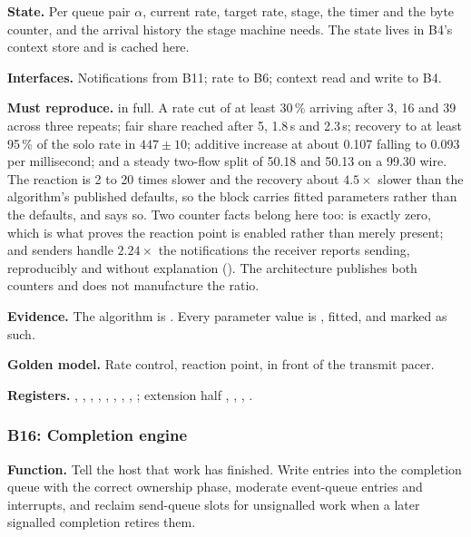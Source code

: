 \textbf{State.} Per queue pair $\alpha$, current rate, target rate, stage, the
timer and the byte counter, and the arrival history the stage machine needs. The
state lives in B4's context store and is cached here.

\textbf{Interfaces.} Notifications from B11; rate to B6; context read and write
to B4.

\textbf{Must reproduce.}  in full. A rate cut of at least 30\,\%
arriving after 3, 16 and 39\mS{} across three repeats; fair share reached after
5\mS{}, 1.8\,s and 2.3\,s; recovery to at least 95\,\% of the solo rate in $447
\pm 10$\mS{}; additive increase at about 0.107 falling to 0.093\Gbps{} per
millisecond; and a steady two-flow split of 50.18 and 50.13\Gbps{} on a
99.30\Gbps{} wire. The reaction is 2 to 20 times slower and the recovery about
$4.5\times$ slower than the algorithm's published defaults, so the block
carries fitted parameters rather than the defaults, and says so. Two counter
facts belong here too:  is exactly zero, which is what
proves the reaction point is enabled rather than merely present; and senders
handle $2.24\times$ the notifications the receiver reports sending, reproducibly
and without explanation (). The architecture publishes both counters
and does not manufacture the ratio.

\textbf{Evidence.} The algorithm is \evdoc{}. Every parameter value is
\evcal{}, fitted, and marked as such.

\textbf{Golden model.} Rate control, reaction point, in front of the transmit
pacer.

{\raggedright
\textbf{Registers.} , ,
, ,
, ,
, , ;
extension half , ,
, .\par}

\subsubsection{B16: Completion engine}

\textbf{Function.} Tell the host that work has finished. Write entries into
the completion queue with the correct ownership phase, moderate event-queue
entries and interrupts, and reclaim send-queue slots for unsignalled work when
a later signalled completion retires them.

